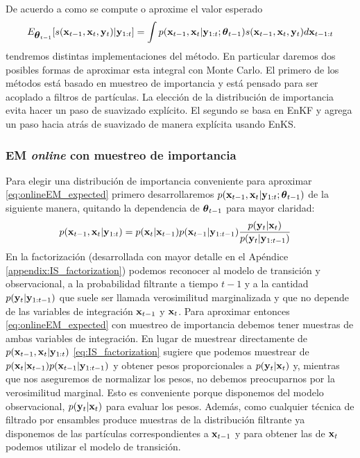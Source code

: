 De acuerdo a como se compute o aproxime el valor esperado
\begin{align}
    E_{\mbox{\boldmath$ \theta $}_{t-1}} [s(\mathbf{x}_{t-1}, \mathbf{x}_t, \mathbf{y}_t) | \mathbf{y}_{1:t}] = \int p(\mathbf{x}_{t-1}, \mathbf{x}_t| \mathbf{y}_{1:t} ; \mbox{\boldmath$ \theta $}_{t-1}) s(\mathbf{x}_{t-1}, \mathbf{x}_t, \mathbf{y}_t) d\mathbf{x}_{t-1:t} \label{eq:onlineEM_expected}
\end{align}
tendremos distintas implementaciones del método. En particular daremos dos posibles formas de aproximar esta integral con Monte Carlo. El primero de los métodos está basado en muestreo de importancia y está pensado para ser acoplado a filtros de partículas. La elección de la distribución de importancia evita hacer un paso de suavizado explícito. El segundo se basa en EnKF y agrega un paso hacia atrás de suavizado de manera explícita usando EnKS. 

\subsubsection*{EM \textit{online} con muestreo de importancia} \label{sec:onlineEM_IS}

Para elegir una distribución de importancia conveniente para aproximar \ref{eq:onlineEM_expected} primero desarrollaremos $p(\mathbf{x}_{t-1}, \mathbf{x}_t| \mathbf{y}_{1:t}; \mbox{\boldmath$ \theta $}_{t-1})$ de la siguiente manera, quitando la dependencia de $\mbox{\boldmath$ \theta $}_{t-1}$ para mayor claridad:
\begin{align}
    p(\mathbf{x}_{t-1}, \mathbf{x}_t| \mathbf{y}_{1:t}) &= p(\mathbf{x}_t | \mathbf{x}_{t-1}) p(\mathbf{x}_{t-1} | \mathbf{y}_{1:t-1}) \frac{p(\mathbf{y}_t | \mathbf{x}_t)}{p(\mathbf{y}_t | \mathbf{y}_{1:t-1})} \label{eq:IS_factorization}
\end{align}
En la factorización (desarrollada con mayor detalle en el Apéndice \ref{appendix:IS_factorization}) podemos reconocer al modelo de transición y observacional, a la probabilidad filtrante a tiempo $t-1$ y a la cantidad $p(\mathbf{y}_t | \mathbf{y}_{1:t-1})$ que suele ser llamada verosimilitud marginalizada y que no depende de las variables de integración $\mathbf{x}_{t-1}$ y $\mathbf{x}_t$. Para aproximar entonces \ref{eq:onlineEM_expected} con muestreo de importancia debemos tener muestras de ambas variables de integración. En lugar de muestrear directamente de $p(\mathbf{x}_{t-1}, \mathbf{x}_t| \mathbf{y}_{1:t})$ \ref{eq:IS_factorization} sugiere que podemos muestrear de $p(\mathbf{x}_t | \mathbf{x}_{t-1}) p(\mathbf{x}_{t-1} | \mathbf{y}_{1:t-1})$ y obtener pesos proporcionales a $p(\mathbf{y}_t | \mathbf{x}_t)$ y, mientras que nos aseguremos de normalizar los pesos, no debemos preocuparnos por la verosimilitud marginal. Esto es conveniente porque disponemos del modelo observacional, $p(\mathbf{y}_t | \mathbf{x}_t)$ para evaluar los pesos. Además, como cualquier técnica de filtrado por ensambles produce muestras de la distribución filtrante ya disponemos de las partículas correspondientes a $\mathbf{x}_{t-1}$ y para obtener las de $\mathbf{x}_t$ podemos utilizar el modelo de transición.


